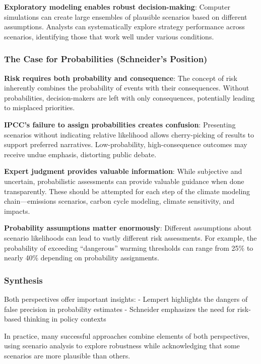 \documentclass[
  letterpaper,
  DIV=11,
  numbers=noendperiod]{scrreprt}
\begin{document}
\textbf{Exploratory modeling enables robust decision-making}: Computer
simulations can create large ensembles of plausible scenarios based on
different assumptions. Analysts can systematically explore strategy
performance across scenarios, identifying those that work well under
various conditions.

\subsubsection{The Case for Probabilities (Schneider's
Position)}\label{the-case-for-probabilities-schneiders-position}

\textbf{Risk requires both probability and consequence}: The concept of
risk inherently combines the probability of events with their
consequences. Without probabilities, decision-makers are left with only
consequences, potentially leading to misplaced priorities.

\textbf{IPCC's failure to assign probabilities creates confusion}:
Presenting scenarios without indicating relative likelihood allows
cherry-picking of results to support preferred narratives.
Low-probability, high-consequence outcomes may receive undue emphasis,
distorting public debate.

\textbf{Expert judgment provides valuable information}: While subjective
and uncertain, probabilistic assessments can provide valuable guidance
when done transparently. These should be attempted for each step of the
climate modeling chain---emissions scenarios, carbon cycle modeling,
climate sensitivity, and impacts.

\textbf{Probability assumptions matter enormously}: Different
assumptions about scenario likelihoods can lead to vastly different risk
assessments. For example, the probability of exceeding ``dangerous''
warming thresholds can range from 25\% to nearly 40\% depending on
probability assignments.

\subsubsection{Synthesis}\label{synthesis}

Both perspectives offer important insights: - Lempert highlights the
dangers of false precision in probability estimates - Schneider
emphasizes the need for risk-based thinking in policy contexts

In practice, many successful approaches combine elements of both
perspectives, using scenario analysis to explore robustness while
acknowledging that some scenarios are more plausible than others.
\end{document}

